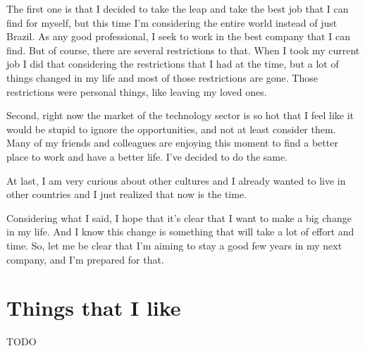 \documentclass[11pt,a4paper,sans]{moderncv}
\begin{document}
\medskip

The first one is that I decided to take the leap and take the best job that I can find for myself, but this time I'm considering the entire world instead of just Brazil.
As any good professional, I seek to work in the best company that I can find.
But of course, there are several restrictions to that.
When I took my current job I did that considering the restrictions that I had at the time, but a lot of things changed in my life and most of those restrictions are gone.
Those restrictions were personal things, like leaving my loved ones.

\medskip

Second, right now the market of the technology sector is so hot that I feel like it would be stupid to ignore the opportunities, and not at least consider them.
Many of my friends and colleagues are enjoying this moment to find a better place to work and have a better life.
I've decided to do the same.

\medskip

At last, I am very curious about other cultures and I already wanted to live in other countries and I just realized that now is the time.

\medskip

Considering what I said, I hope that it's clear that I want to make a big change in my life.
And I know this change is something that will take a lot of effort and time.
So, let me be clear that I'm aiming to stay a good few years in my next company, and I'm prepared for that.

\section{Things that I like}
TODO
\end{document}
